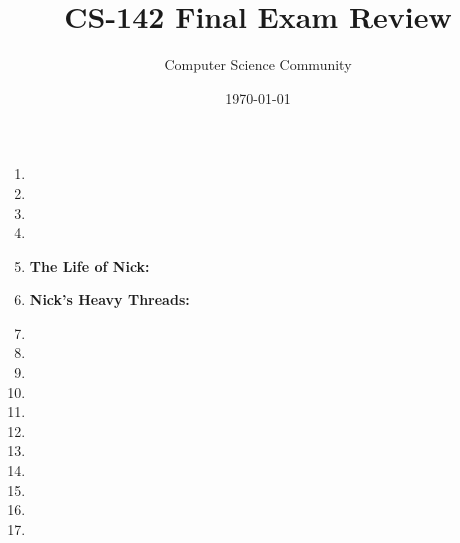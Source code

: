 \documentclass[11pt]{article}
\author{Computer Science Community}
\title{CS-142 Final Exam Review}
\date{\today}
\begin{document}
\header

\begin{enumerate}
\item 

\item 

\newpage
\item 

\item 

\item {\bf The Life of Nick:}
    

\pagebreak
\item {\bf Nick's Heavy Threads:}
	

\pagebreak
\item 

\pagebreak
	\item 
	\item 
	\item 
	\item 

\pagebreak
\item 

\item 

\pagebreak
\item 

\item 

\newpage
\item 

\newpage
\item 

\end{enumerate}
\end{document}

